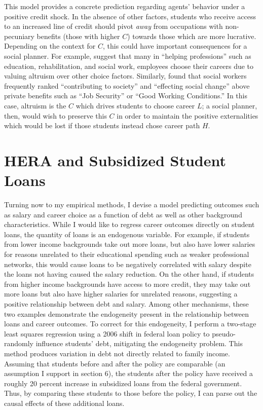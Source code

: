 \documentclass[12pt]{article}
\begin{document}
	This model provides a concrete prediction regarding agents' behavior under a positive credit shock. In the absence of other factors, students who receive access to an increased line of credit should pivot \emph{away} from occupations with non-pecuniary benefits (those with higher $C$) towards those which are more lucrative. Depending on the context for $C$, this could have important consequences for a social planner. For example, \textcite{benshem1991} suggest that many in ``helping professions'' such as education, rehabilitation, and social work, employees choose their careers due to valuing altruism over other choice factors. Similarly, \textcite{hanson1995} found that social workers frequently ranked ``contributing to society'' and ``effecting social change'' above private benefits such as ``Job Security'' or ``Good Working Conditions.'' In this case, altruism is the $C$ which drives students to choose career $L$; a social planner, then, would wish to preserve this $C$ in order to maintain the positive externalities which would be lost if those students instead chose career path $H$.

	\section{HERA and Subsidized Student Loans}
	
	Turning now to my empirical methods, I devise a model predicting outcomes such as salary and career choice as a function of debt as well as other background characteristics. While I would like to regress career outcomes directly on student loans, the quantity of loans is an endogenous variable. For example, if students from lower income backgrounds take out more loans, but also have lower salaries for reasons unrelated to their educational spending such as weaker professional networks, this would cause loans to be negatively correlated with salary despite the loans not having caused the salary reduction. On the other hand, if students from higher income backgrounds have access to more credit, they may take out more loans but also have higher salaries for unrelated reasons, suggesting a positive relationship between debt and salary. Among other mechanisms, these two examples demonstrate the endogeneity present in the relationship between loans and career outcomes. To correct for this endogeneity, I perform a two-stage least squares regression using a 2006 shift in federal loan policy to pseudo-randomly influence students' debt, mitigating the endogeneity problem. This method produces variation in debt not directly related to family income. Assuming that students before and after the policy are comparable (an assumption I support in section 6), the students after the policy have received a roughly 20 percent increase in subsidized loans from the federal government. Thus, by comparing these students to those before the policy, I can parse out the causal effects of these additional loans.
	
\end{document}
